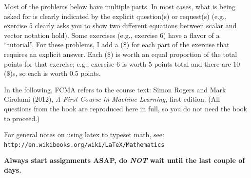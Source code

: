 \documentclass[10pt]{article}
\begin{document}
Most of the problems below have multiple parts.  In most cases, what is being asked for is clearly indicated by the explicit question(s) or request(s) (e.g., exercise 5 clearly asks you to show two different equations between scalar and vector notation hold).  Some exercises (e.g., exercise 6) have a flavor of a ``tutorial''.  For these problems, I add a (\$) for each part of the exercise that requires an explicit answer.  Each (\$) is worth an equal proportion of the total points for that exercise; e.g., exercise 6 is worth 5 points total and there are 10 (\$)s, so each is worth 0.5 points.

In the following, FCMA refers to the course text: Simon Rogers and Mark Girolami (2012), {\em A First Course in Machine Learning}, first edition.  (All questions from the book are reproduced here in full, so you do not need the book to proceed.)

For general notes on using latex to typeset math, see: {\tt http://en.wikibooks.org/wiki/LaTeX/Mathematics}

{\bf Always start assignments ASAP, do {\em NOT} wait until the last couple of days.}

\vspace{.5cm}

\end{document}
